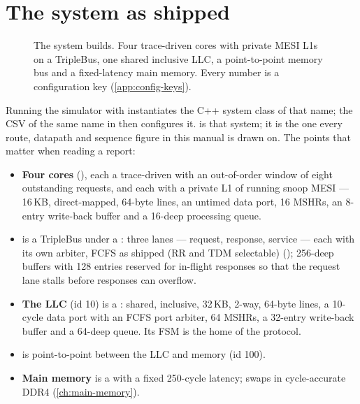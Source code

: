 
\section{The system as shipped}\label{sec:shipped-system}

\begin{figure}[htbp]\centering

\caption{The system  builds. Four trace-driven cores with private
MESI L1s on a TripleBus, one shared inclusive LLC, a point-to-point memory bus and a
fixed-latency main memory. Every number is a configuration key (\cref{app:config-keys}).}
\label{fig:shipped-system}
\end{figure}

Running the simulator with  instantiates the C++ system class of
that name; the CSV of the same name in  then
configures it.  is that
system; it is the one every route, datapath and sequence figure in this manual is drawn on.
The points that matter when reading a report:

\begin{itemize}
\item \textbf{Four cores} (), each a trace-driven  with an
  out-of-order window of eight outstanding requests, and each with a private L1 of
   running snoop MESI --- 16\,KB, direct-mapped, 64-byte lines,
  an untimed data port, 16 MSHRs, an 8-entry write-back buffer and a 16-deep processing queue.
\item \textbf{} is a TripleBus under a : three lanes ---
  request, response, service --- each with its own arbiter, FCFS as shipped (RR and TDM selectable)
  (); 256-deep buffers with 128 entries reserved for in-flight
  responses so that the request lane stalls before responses can overflow.
\item \textbf{The LLC} (id 10) is a : shared, inclusive, 32\,KB,
  2-way, 64-byte lines, a 10-cycle data port with an FCFS port arbiter, 64 MSHRs, a 32-entry
  write-back buffer and a 64-deep queue. Its  FSM is the home of the protocol.
\item \textbf{} is point-to-point between the LLC and memory (id 100).
\item \textbf{Main memory} is a  with a fixed 250-cycle latency;
   swaps in cycle-accurate DDR4 (\cref{ch:main-memory}).
\end{itemize}

